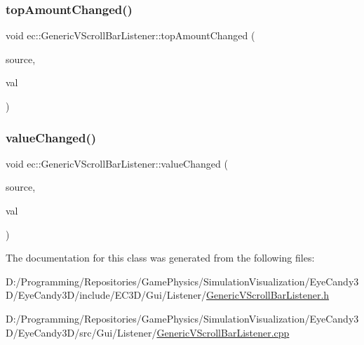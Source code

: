 \mbox{\label{classec_1_1_generic_v_scroll_bar_listener_aa781034d565c6b2f50ffea047fd0dc5f}} 
\subsubsection{\texorpdfstring{top\+Amount\+Changed()}{topAmountChanged()}}
{\footnotesize\ttfamily void ec\+::\+Generic\+V\+Scroll\+Bar\+Listener\+::top\+Amount\+Changed (\begin{DoxyParamCaption}\item[{agui\+::\+V\+Scroll\+Bar $\ast$}]{source,  }\item[{int}]{val }\end{DoxyParamCaption})\hspace{0.3cm}{\ttfamily [override]}}

\mbox{\label{classec_1_1_generic_v_scroll_bar_listener_a6718d45dd6536a326181775dc2c16570}} 
\subsubsection{\texorpdfstring{value\+Changed()}{valueChanged()}}
{\footnotesize\ttfamily void ec\+::\+Generic\+V\+Scroll\+Bar\+Listener\+::value\+Changed (\begin{DoxyParamCaption}\item[{agui\+::\+V\+Scroll\+Bar $\ast$}]{source,  }\item[{int}]{val }\end{DoxyParamCaption})\hspace{0.3cm}{\ttfamily [override]}}



The documentation for this class was generated from the following files\+:\begin{DoxyCompactItemize}
\item 
D\+:/\+Programming/\+Repositories/\+Game\+Physics/\+Simulation\+Visualization/\+Eye\+Candy3\+D/\+Eye\+Candy3\+D/include/\+E\+C3\+D/\+Gui/\+Listener/\mbox{\hyperlink{_generic_v_scroll_bar_listener_8h}{Generic\+V\+Scroll\+Bar\+Listener.\+h}}\item 
D\+:/\+Programming/\+Repositories/\+Game\+Physics/\+Simulation\+Visualization/\+Eye\+Candy3\+D/\+Eye\+Candy3\+D/src/\+Gui/\+Listener/\mbox{\hyperlink{_generic_v_scroll_bar_listener_8cpp}{Generic\+V\+Scroll\+Bar\+Listener.\+cpp}}\end{DoxyCompactItemize}
